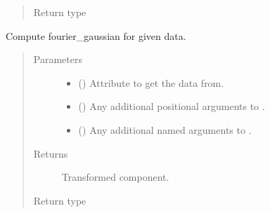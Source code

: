 \documentclass[letterpaper,10pt,english]{sphinxmanual}
\begin{document}
\begin{fulllineitems}
\begin{fulllineitems}
\begin{quote}
\begin{description}
\item[{Return type}] \leavevmode
{\hyperref[\detokenize{api/base_classes:geology.src.base_spatial.SpatialComponent}]{}}

\end{description}\end{quote}

\end{fulllineitems}


\begin{fulllineitems}
\label{\detokenize{api/states:geology.src.States.fourier_gaussian}}
Compute fourier\_gaussian for given data.
\begin{quote}\begin{description}
\item[{Parameters}] \leavevmode\begin{itemize}
\item {} 
 (\sphinxstyleliteralemphasis{\sphinxupquote{, }}) \textendash{} Attribute to get the data from.

\item {} 
 () \textendash{} Any additional positional arguments to .

\item {} 
 () \textendash{} Any additional named arguments to .

\end{itemize}

\item[{Returns}] \leavevmode
{} \textendash{} Transformed component.

\item[{Return type}] \leavevmode
{\hyperref[\detokenize{api/base_classes:geology.src.base_spatial.SpatialComponent}]{}}


\end{description}
\end{quote}
\end{fulllineitems}
\end{fulllineitems}
\end{document}
